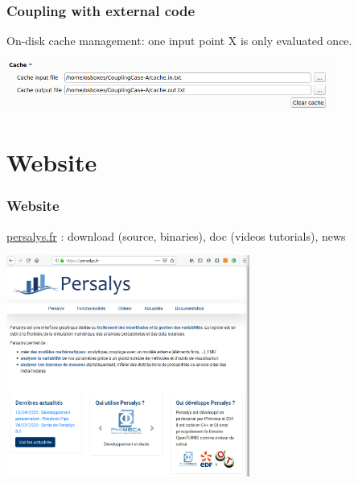 \documentclass{beamer}
\begin{document}

\begin{frame}
\frametitle{Coupling with external code}

On-disk cache management: one input point X is only evaluated once. 

\begin{center}
\includegraphics[width=0.8\textwidth]{figures/coupling-cache-focus.png}
\end{center}

\end{frame}


\section{Website}

\begin{frame}
\frametitle{Website}

\url{persalys.fr} : download (source, binaries), doc (videos tutorials), news
	
\begin{center}
\includegraphics[width=0.6\textwidth]{figures/persalys-web.png}
\end{center}

\end{frame}

\end{document}
